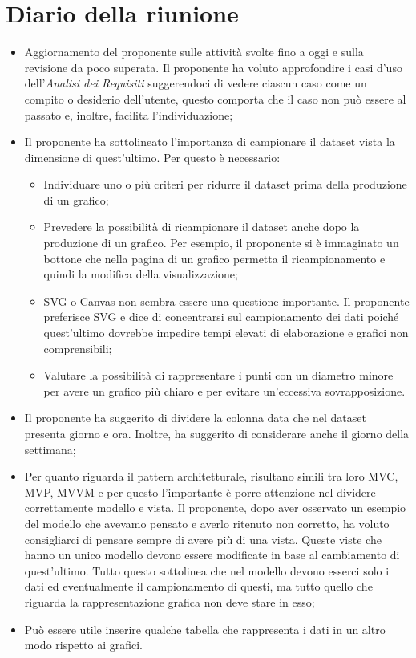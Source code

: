 \section{Diario della riunione}
\begin{itemize}
  \item Aggiornamento del proponente sulle attività svolte fino a oggi e sulla revisione da poco superata. Il proponente ha voluto approfondire i casi d'uso dell'\textit{Analisi dei Requisiti}
    suggerendoci di vedere ciascun caso come un compito o desiderio dell'utente, questo comporta che il caso non può essere al passato e, inoltre, facilita l'individuazione;
  \item Il proponente ha sottolineato l'importanza di campionare il dataset vista la dimensione di quest'ultimo. Per questo è necessario:
    \begin{itemize}
      \item Individuare uno o più criteri per ridurre il dataset prima della produzione di un grafico;
      \item Prevedere la possibilità di ricampionare il dataset anche dopo la produzione di un grafico. Per esempio, il proponente si è immaginato un bottone che nella pagina di un grafico permetta il ricampionamento e quindi la modifica della visualizzazione;
      \item SVG o Canvas non sembra essere una questione importante. Il proponente preferisce SVG e dice di concentrarsi sul campionamento dei dati poiché quest'ultimo dovrebbe impedire tempi elevati di elaborazione e grafici non comprensibili;
      \item Valutare la possibilità di rappresentare i punti con un diametro minore per avere un grafico più chiaro e per evitare un'eccessiva sovrapposizione.
    \end{itemize}
  \item Il proponente ha suggerito di dividere la colonna data che nel dataset presenta giorno e ora. Inoltre, ha suggerito di considerare anche il giorno della settimana;
  \item Per quanto riguarda il pattern architetturale, risultano simili tra loro MVC, MVP, MVVM e per questo l'importante è porre attenzione nel dividere correttamente modello e vista. 
    Il proponente, dopo aver osservato un esempio del modello che avevamo pensato e averlo ritenuto non corretto, ha voluto consigliarci di pensare sempre di avere più di una vista. Queste viste che hanno un unico modello devono essere modificate in base al cambiamento di quest'ultimo.
    Tutto questo sottolinea che nel modello devono esserci solo i dati ed eventualmente il campionamento di questi, ma tutto quello che riguarda la rappresentazione grafica non deve stare in esso;
  \item Può essere utile inserire qualche tabella che rappresenta i dati in un altro modo rispetto ai grafici.
\end{itemize}
